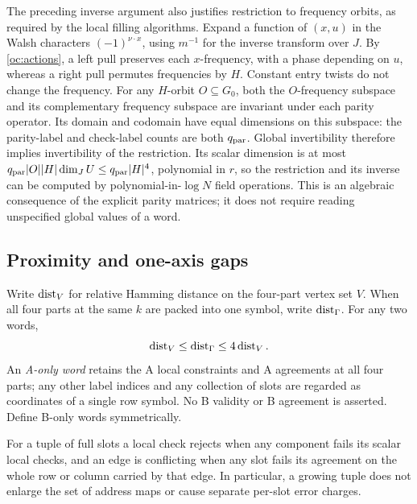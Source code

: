 \begin{remark}\label{oc:orbit-invariance}
The preceding inverse argument also justifies restriction to frequency
orbits, as required by the local filling algorithms.  Expand a function
of $(x,u)$ in the Walsh characters $(-1)^{\nu\cdot x}$, using $m^{-1}$
for the inverse transform over $J$.  By \eqref{oc:actions}, a left pull
preserves each $x$-frequency, with a phase depending on $u$, whereas
a right pull permutes frequencies by $H$.  Constant entry twists do
not change the frequency.  For any $H$-orbit $O\subseteq G_0$, both
the $O$-frequency subspace and its complementary frequency subspace
are invariant under each parity operator.  Its domain and codomain
have equal dimensions on this subspace: the parity-label and
check-label counts are both $q_{\rm par}$.  Global invertibility
therefore implies invertibility of the restriction.  Its scalar
dimension is at most $q_{\rm par}|O||H|\dim_JU\le
q_{\rm par}|H|^4$, polynomial in $r$, so the restriction and its
inverse can be computed by polynomial-in-$\log N$ field operations.
This is an algebraic consequence of the explicit parity matrices;
it does not require reading unspecified global values of a word.
\end{remark}

\subsection{Proximity and one-axis gaps}

Write $\operatorname{dist}_V$ for relative Hamming distance on the four-part vertex
set $V$.  When all four parts at the same $k$ are packed into one
symbol, write $\operatorname{dist}_\Gamma$.  For any two words,
\begin{equation}\label{oc:packing-metric}
 \operatorname{dist}_V\le\operatorname{dist}_\Gamma\le4\operatorname{dist}_V.
\end{equation}
An \emph{A-only word} retains the A local constraints and A agreements
at all four parts; any other label indices and any collection of slots
are regarded as coordinates of a single row symbol.  No B validity
or B agreement is asserted.  Define B-only words symmetrically.

For a tuple of full slots a local check rejects when any component
fails its scalar local checks, and an edge is conflicting when any
slot fails its agreement on the whole row or column carried by that
edge.  In particular, a growing tuple does not enlarge the set of
address maps or cause separate per-slot error charges.

